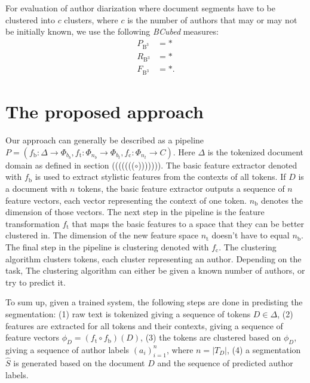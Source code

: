 \documentclass[10pt, a4paper]{article}
\begin{document}
For evaluation of author diarization where document segments have to be clustered into $c$ clusters, where $c$ is the number of authors that may or may not be initially known, we use the following \emph{BCubed} measures:
\begin{align}
P_\mathrm{B^3} &= *  \\
R_\mathrm{B^3} &= * \\
F_\mathrm{B^3} &= *.
\end{align}




\section{The proposed approach}

Our approach can generally be described as a pipeline $P = (f_\mathrm{b}:\Delta\rightarrow \Phi_{b_b}, f_\mathrm{t}:\Phi_{n_b}\rightarrow \Phi_{b_t}, f_\mathrm{c}:\Phi_{n_t}\rightarrow C)$. Here $\Delta$ is the tokenized document domain as defined in section ((((((($\circ$))))))). The basic feature extractor denoted with $f_\mathrm{b}$ is used to extract stylistic features from the contexts of all tokens. If $D$ is a document with $n$ tokens, the basic feature extractor outputs a sequence of $n$ feature vectors, each vector representing the context of one token. $n_\mathrm{b}$ denotes the dimension of those vectors. The next step in the pipeline is the feature transformation $f_\mathrm{t}$ that maps the basic features to a space that they can be better clustered in. The dimension of the new feature space $n_\mathrm{t}$ doesn't have to equal $n_\mathrm{b}$. The final step in the pipeline is clustering denoted with $f_\mathrm{c}$. The clustering algorithm clusters tokens, each cluster representing an author. Depending on the task, The clustering algorithm can either be given a known number of authors, or try to predict it.

To sum up, given a trained system, the following steps are done in predisting the segmentation: (1) raw text is tokenized giving a sequence of tokens $D\in \Delta$, (2) features are extracted for all tokens and their contexts, giving a sequence of feature vectors $\phi_D = (f_\mathrm{t}\circ f_\mathrm{b})(D)$, (3) the tokens are clustered based on $\phi_D$, giving a sequence of author labels $(a_i)_{i=1}^{n}$, where $n=|T_D|$, (4) a segmentation $\hat{S}$ is generated based on the document $D$ and the sequence of predicted author labels.
\end{document}
